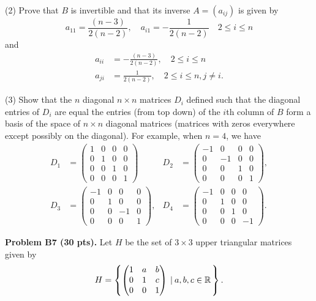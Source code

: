 \documentclass[12pt]{article}
\begin{document}
\medskip
(2)
Prove that $B$ is invertible and that its inverse $A = (a_{i j})$ is given by
\[
a_{1 1} =  \frac{(n - 3)}{2(n - 2)}, \quad
a_{i 1} = - \frac{1}{2(n - 2)} \quad 2\leq i \leq n
\]
and
\begin{align*}
a_{i i} & =  - \frac{(n - 3)}{2(n - 2)}, \quad 2 \leq i \leq n \\
a_{j i} & =  \frac{1}{2(n - 2)}, \quad 2\leq i \leq n, j\not= i.
\end{align*}

\medskip
(3)
Show that the $n$ diagonal $n\times n$ matrices $D_i$
defined such that the diagonal entries of  $D_i$
are equal the entries  (from top down)  of the $i$th column of $B$ form a basis
of the space of $n\times n$ diagonal matrices
(matrices with zeros everywhere except possibly on the diagonal).
For example, when $n = 4$, we have
\begin{align*}
D_1 & = 
\begin{pmatrix}
1 & 0 & 0 & 0 \\
0 & 1 & 0 & 0 \\
0 & 0 & 1 & 0 \\
0 & 0 & 0 & 1 
\end{pmatrix}
&
D_2 & = 
\begin{pmatrix}
-1 & 0 & 0 & 0 \\
0 & -1 & 0 & 0 \\
0 & 0 & 1 & 0 \\
0 & 0 & 0 & 1 
\end{pmatrix},
\\
D_3 &= 
\begin{pmatrix}
-1 & 0 & 0 & 0 \\
0 & 1 & 0 & 0 \\
0 & 0 & -1 & 0 \\
0 & 0 & 0 & 1 
\end{pmatrix},
&
D_4 &= 
\begin{pmatrix}
-1 & 0 & 0 & 0 \\
0 & 1 & 0 & 0 \\
0 & 0 & 1 & 0 \\
0 & 0 & 0 & -1 
\end{pmatrix}.
\end{align*}

\vspace {0.25cm}\noindent
{\bf Problem B7 (30 pts).}
Let $H$ be the set of
$3\times 3$  upper triangular matrices  given by
\[
H = 
\left\{
\begin{pmatrix}
1 & a & b \\
0 & 1 & c \\
0 & 0 & 1
\end{pmatrix}
\> \left|\> a, b, c\in \mathbb{R} \right.
\right\}.
\]
\end{document}
